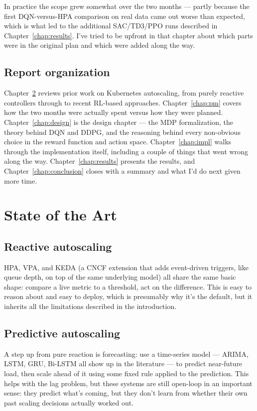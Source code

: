 \documentclass{rapportINPTCLOUD}
\begin{document}
In practice the scope grew somewhat over the two months — partly because the first DQN-versus-HPA comparison on real data came out worse than expected, which is what led to the additional SAC/TD3/PPO runs described in Chapter~\ref{chap:results}. I've tried to be upfront in that chapter about which parts were in the original plan and which were added along the way.

\section{Report organization}

Chapter~\ref{chap:sota} reviews prior work on Kubernetes autoscaling, from purely reactive controllers through to recent RL-based approaches. Chapter~\ref{chap:pm} covers how the two months were actually spent versus how they were planned. Chapter~\ref{chap:design} is the design chapter — the MDP formalization, the theory behind DQN and DDPG, and the reasoning behind every non-obvious choice in the reward function and action space. Chapter~\ref{chap:impl} walks through the implementation itself, including a couple of things that went wrong along the way. Chapter~\ref{chap:results} presents the results, and Chapter~\ref{chap:conclusion} closes with a summary and what I'd do next given more time.

\chapter{State of the Art}
\label{chap:sota}

\section{Reactive autoscaling}

HPA, VPA, and KEDA (a CNCF extension that adds event-driven triggers, like queue depth, on top of the same underlying model) all share the same basic shape: compare a live metric to a threshold, act on the difference. This is easy to reason about and easy to deploy, which is presumably why it's the default, but it inherits all the limitations described in the introduction.

\section{Predictive autoscaling}

A step up from pure reaction is forecasting: use a time-series model — ARIMA, LSTM, GRU, Bi-LSTM all show up in the literature — to predict near-future load, then scale ahead of it using some fixed rule applied to the prediction. This helps with the lag problem, but these systems are still open-loop in an important sense: they predict what's coming, but they don't learn from whether their own past scaling decisions actually worked out.
\end{document}
